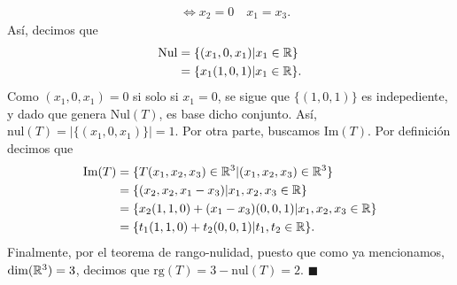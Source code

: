 \documentclass[11pt]{scrartcl}
\begin{document}
\begin{enumerate}[a)]
\begin{align*}
        &\iff x_2=0 \quad x_1=x_3.
    \end{align*}
    Así, decimos que
    \begin{align*}
        \text{Nul} &= \{(x_1,0,x_1)|x_1 \in \mathbb R\} \\
        &= \{x_1(1,0,1)|x_1 \in \mathbb R\}.
    \end{align*}
    Como $(x_1,0,x_1)=0$ si solo si $x_1=0$, se sigue que $\{(1,0,1)\}$ es indepediente, y dado que genera $\text{Nul}(T)$,
    es base dicho conjunto. Así, $\text{nul}(T)=|\{(x_1,0,x_1)\}|=1$. Por otra parte, buscamos $\text{Im}(T)$. Por definición decimos que
    \begin{align*}
        \text{Im}(T) &= \{T(x_1,x_2,x_3)\in \mathbb R^3 | (x_1,x_2,x_3) \in \mathbb R^3\} \\
        &= \{(x_2,x_2,x_1-x_3)|x_1,x_2,x_3 \in \mathbb R\} \\
        &= \{x_2(1,1,0)+(x_1-x_3)(0,0,1)|x_1,x_2,x_3 \in \mathbb R\} \\
        &= \{t_1(1,1,0)+t_2(0,0,1)|t_1,t_2 \in \mathbb R\}.
    \end{align*}
    Finalmente, por el teorema de rango-nulidad, puesto que como ya mencionamos, $\dim(\mathbb R^3)=3$, decimos que $\text{rg}(T)=3-\text{nul}(T)=2.$ $\blacksquare$
\end{enumerate}
\end{document}
